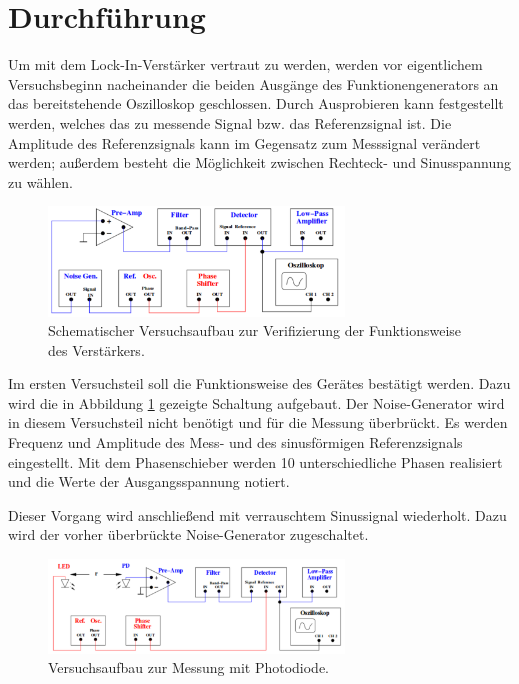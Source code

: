 \section{Durchführung}
\label{sec:Durchfuehrung}
Um mit dem Lock-In-Verstärker vertraut zu werden, werden vor eigentlichem Versuchsbeginn nacheinander die beiden Ausgänge des Funktionengenerators an das bereitstehende Oszilloskop geschlossen. 
Durch Ausprobieren kann festgestellt werden, welches das zu messende Signal bzw. das Referenzsignal ist.
Die Amplitude des Referenzsignals kann im Gegensatz zum Messsignal verändert werden; 
außerdem besteht die Möglichkeit zwischen Rechteck- und Sinusspannung zu wählen.
\begin{figure}
	\centering
	\includegraphics[width=0.7\textwidth]{Bilder/Messung1.pdf}	
	\caption{Schematischer Versuchsaufbau zur Verifizierung der Funktionsweise des Verstärkers. \cite{V303}}
	\label{fig:M1}	
\end{figure}

Im ersten Versuchsteil soll die Funktionsweise des Gerätes bestätigt werden. 
Dazu wird die in Abbildung \ref{fig:M1} gezeigte Schaltung aufgebaut. 
Der Noise-Generator wird in diesem Versuchsteil nicht benötigt und für die Messung überbrückt. 
Es werden Frequenz und Amplitude des Mess- und des sinusförmigen Referenzsignals eingestellt. 
Mit dem Phasenschieber werden 10 unterschiedliche Phasen realisiert und die Werte der Ausgangsspannung notiert.

Dieser Vorgang wird anschließend mit verrauschtem Sinussignal wiederholt. 
Dazu wird der vorher überbrückte Noise-Generator zugeschaltet.

\begin{figure}
	\centering
		\includegraphics[width=0.7\textwidth]{Bilder/Messung2.pdf}
		\caption{Versuchsaufbau zur Messung mit Photodiode. \cite{V303}}
		\label{fig:M2}
	\end{figure}

